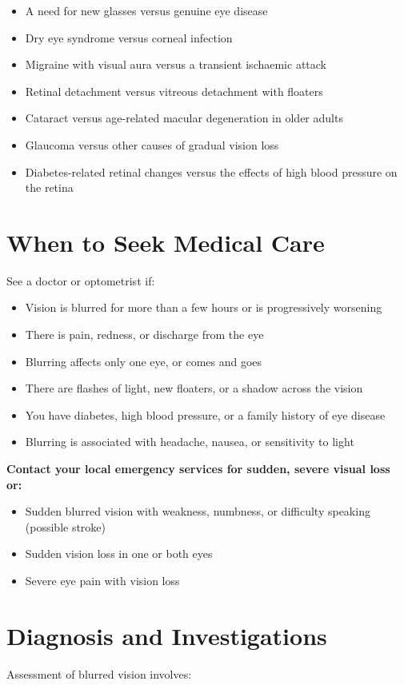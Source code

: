 \begin{itemize}
    \item A need for new glasses versus genuine eye disease
    \item Dry eye syndrome versus corneal infection
    \item Migraine with visual aura versus a transient ischaemic attack
    \item Retinal detachment versus vitreous detachment with floaters
    \item Cataract versus age-related macular degeneration in older adults
    \item Glaucoma versus other causes of gradual vision loss
    \item Diabetes-related retinal changes versus the effects of high blood pressure on the retina
\end{itemize}

\section*{When to Seek Medical Care}
See a doctor or optometrist if:

\begin{itemize}
    \item Vision is blurred for more than a few hours or is progressively worsening
    \item There is pain, redness, or discharge from the eye
    \item Blurring affects only one eye, or comes and goes
    \item There are flashes of light, new floaters, or a shadow across the vision
    \item You have diabetes, high blood pressure, or a family history of eye disease
    \item Blurring is associated with headache, nausea, or sensitivity to light
\end{itemize}

\textbf{Contact your local emergency services for sudden, severe visual loss or:}
\begin{itemize}
    \item Sudden blurred vision with weakness, numbness, or difficulty speaking (possible stroke)
    \item Sudden vision loss in one or both eyes
    \item Severe eye pain with vision loss
\end{itemize}

\section*{Diagnosis and Investigations}
Assessment of blurred vision involves:

